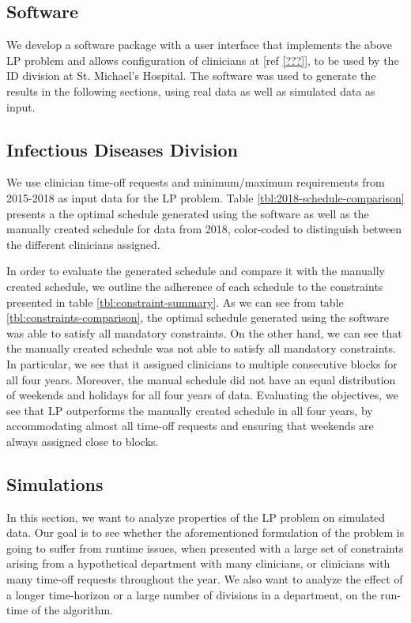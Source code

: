 \subsection{Software}
We develop a software package with a user interface that implements the above LP problem and allows configuration of clinicians at [ref \ref{???}], to be used by the ID division at St. Michael's Hospital. The software was used to generate the results in the following sections, using real data as well as simulated data as input.

\subsection{Infectious Diseases Division}
We use clinician time-off requests and minimum/maximum requirements from 2015-2018 as input data for the LP problem. Table \ref{tbl:2018-schedule-comparison} presents a the optimal schedule generated using the software as well as the manually created schedule for data from 2018, color-coded to distinguish between the different clinicians assigned.



In order to evaluate the generated schedule and compare it with the manually created schedule, we outline the adherence of each schedule to the constraints presented in table \ref{tbl:constraint-summary}. As we can see from table \ref{tbl:constraints-comparison}, the optimal schedule generated using the software was able to satisfy all mandatory constraints. On the other hand, we can see that the manually created schedule was not able to satisfy all mandatory constraints. In particular, we see that it assigned clinicians to multiple consecutive blocks for all four years. Moreover, the manual schedule did not have an equal distribution of weekends and holidays for all four years of data. Evaluating the objectives, we see that LP outperforms the manually created schedule in all four years, by accommodating almost all time-off requests and ensuring that weekends are always assigned close to blocks.



\subsection{Simulations}
In this section, we want to analyze properties of the LP problem on simulated data. Our goal is to see whether the aforementioned formulation of the problem is going to suffer from runtime issues, when presented with a large set of constraints arising from a hypothetical department with many clinicians, or clinicians with many time-off requests throughout the year. We also want to analyze the effect of a longer time-horizon or a large number of divisions in a department, on the run-time of the algorithm. \\

